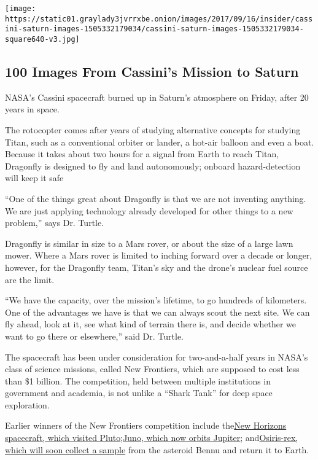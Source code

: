 \texttt{[image: https://static01.graylady3jvrrxbe.onion/images/2017/09/16/insider/cassini-saturn-images-1505332179034/cassini-saturn-images-1505332179034-square640-v3.jpg]}

\hypertarget{100-images-from-cassinis-mission-to-saturn}{%
\subsection{100 Images From Cassini's Mission to
Saturn}\label{100-images-from-cassinis-mission-to-saturn}}

NASA's Cassini spacecraft burned up in Saturn's atmosphere on Friday,
after 20 years in space.

The rotocopter comes after years of studying alternative concepts for
studying Titan, such as a conventional orbiter or lander, a hot-air
balloon and even a boat. Because it takes about two hours for a signal
from Earth to reach Titan, Dragonfly is designed to fly and land
autonomously; onboard hazard-detection will keep it safe

``One of the things great about Dragonfly is that we are not inventing
anything. We are just applying technology already developed for other
things to a new problem,'' says Dr. Turtle.

Dragonfly is similar in size to a Mars rover, or about the size of a
large lawn mower. Where a Mars rover is limited to inching forward over
a decade or longer, however, for the Dragonfly team, Titan's sky and the
drone's nuclear fuel source are the limit.

``We have the capacity, over the mission's lifetime, to go hundreds of
kilometers. One of the advantages we have is that we can always scout
the next site. We can fly ahead, look at it, see what kind of terrain
there is, and decide whether we want to go there or elsewhere,'' said
Dr. Turtle.

The spacecraft has been under consideration for two-and-a-half years in
NASA's class of science missions, called New Frontiers, which are
supposed to cost less than \$1 billion. The competition, held between
multiple institutions in government and academia, is not unlike a
``Shark Tank'' for deep space exploration.

Earlier winners of the New Frontiers competition include
the\href{https://www.nytimes3xbfgragh.onion/interactive/2016/03/17/science/pluto-images-charon-moons-new-horizons-flyby.html}{New
Horizons spacecraft, which visited
Pluto};\href{https://www.nytimes3xbfgragh.onion/2017/12/13/science/jupiter-great-red-spot-juno.html}{Juno,
which now orbits Jupiter};
and\href{https://www.nytimes3xbfgragh.onion/interactive/2019/03/19/science/osiris-rex-bennu-photos.html}{Osiris-rex,
which will soon collect a sample} from the asteroid Bennu and return it
to Earth.

